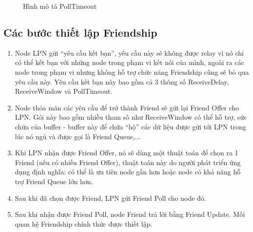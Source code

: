 \begin{itemize}
\begin{figure}[h!]
\begin{center}
        		\caption{Hình mô tả PollTimeout}
        	\end{center}
          \end{figure}
       \end{itemize}
       \subsection{Các bước thiết lập Friendship}
       \begin{enumerate}
       \item Node LPN gửi ``yêu cầu kết bạn'', yêu cầu này sẽ không được relay vì nó chỉ có thể kết bạn với những node trong phạm vi kết nối của mình, ngoài ra các node trong phạm vi nhưng không hỗ trợ chức năng Friendship cũng sẽ bỏ qua yêu cầu này. Yêu cầu kết bạn này bao gồm cả 3 thông số ReceiveDelay, ReceiveWindow và PollTimeout.
       \item Node thỏa mãn các yêu cầu để trở thành Friend sẽ gửi lại Friend Offer cho LPN. Gói này bao gồm nhiều tham số như ReceiveWindow có thể hỗ trợ, sức chứa của buffer - buffer này để chứa ``hộ'' các dữ liệu được gửi tới LPN trong lúc nó ngủ và được gọi là Friend Queue,...      
       \item Khi LPN nhận được Friend Offer, nó sẽ dùng một thuật toán để chọn ra 1 Friend (nếu có nhiều Friend Offer), thuật toán này do người phát triển ứng dụng định nghĩa: có thể là ưu tiên node gần hơn hoặc node có khả năng hỗ trợ Friend Queue lớn hơn.
       \item Sau khi đã chọn được Friend, LPN gửi Friend Poll cho node đó.
       \item Sau khi nhận được Friend Poll, node Friend trả lời bằng Friend Update. Mối quan hệ Friendship chính thức được thiết lập.
       \end{enumerate}
